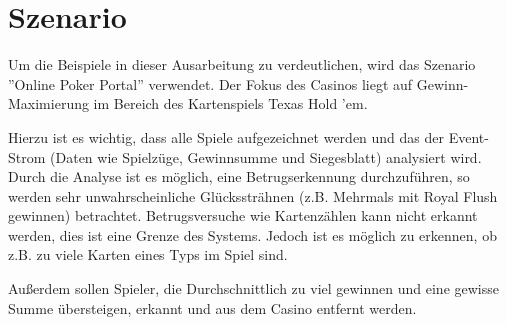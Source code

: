 \chapter{Szenario}
Um die Beispiele in dieser Ausarbeitung zu verdeutlichen, wird das Szenario ''Online Poker Portal'' verwendet. Der Fokus des Casinos liegt auf Gewinn-Maximierung im Bereich des Kartenspiels Texas Hold 'em.

Hierzu ist es wichtig, dass alle Spiele aufgezeichnet werden und das der Event-Strom (Daten wie Spielzüge, Gewinnsumme und Siegesblatt) analysiert wird. 
Durch die Analyse ist es möglich, eine Betrugserkennung durchzuführen, so werden sehr unwahrscheinliche Glückssträhnen (z.B. Mehrmals mit Royal Flush gewinnen) betrachtet.
Betrugsversuche wie Kartenzählen kann nicht erkannt werden, dies ist eine Grenze des Systems. Jedoch ist es möglich zu erkennen, ob z.B. zu viele Karten eines Typs im Spiel sind.

Außerdem sollen Spieler, die Durchschnittlich zu viel gewinnen und eine gewisse Summe übersteigen, erkannt und aus dem Casino entfernt werden.